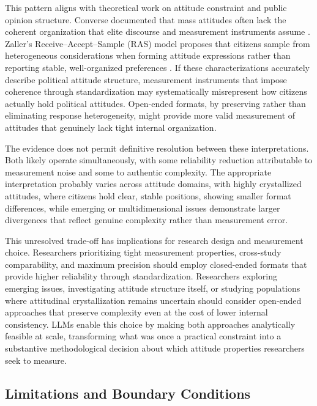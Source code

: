 \documentclass[
  journal=ram,
  manuscript=article-type,
  year=2025,
  volume=unpublished,
]{cup-journal}
\begin{document}
This pattern aligns with theoretical work on attitude constraint and public opinion structure.
Converse documented that mass attitudes often lack the coherent organization that elite discourse and measurement instruments assume \citep{converse64}.
Zaller’s Receive–Accept–Sample (RAS) model proposes that citizens sample from heterogeneous considerations when forming attitude expressions rather than reporting stable, well-organized preferences \citep{zaller92}.
If these characterizations accurately describe political attitude structure, measurement instruments that impose coherence through standardization may systematically misrepresent how citizens actually hold political attitudes.
Open-ended formats, by preserving rather than eliminating response heterogeneity, might provide more valid measurement of attitudes that genuinely lack tight internal organization.

The evidence does not permit definitive resolution between these interpretations.
Both likely operate simultaneously, with some reliability reduction attributable to measurement noise and some to authentic complexity.
The appropriate interpretation probably varies across attitude domains, with highly crystallized attitudes, where citizens hold clear, stable positions, showing smaller format differences, while emerging or multidimensional issues demonstrate larger divergences that reflect genuine complexity rather than measurement error.

This unresolved trade-off has implications for research design and measurement choice.
Researchers prioritizing tight measurement properties, cross-study comparability, and maximum precision should employ closed-ended formats that provide higher reliability through standardization.
Researchers exploring emerging issues, investigating attitude structure itself, or studying populations where attitudinal crystallization remains uncertain should consider open-ended approaches that preserve complexity even at the cost of lower internal consistency.
LLMs enable this choice by making both approaches analytically feasible at scale, transforming what was once a practical constraint into a substantive methodological decision about which attitude properties researchers seek to measure.

\subsection{Limitations and Boundary Conditions}
\end{document}
